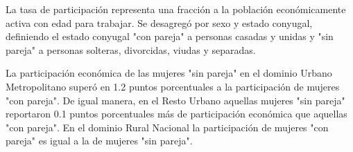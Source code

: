 La tasa de participación representa una fracción a la población económicamente activa con edad para trabajar. Se desagregó por sexo y estado conyugal, definiendo el estado conyugal "con pareja" a personas casadas y unidas y "sin pareja" a personas solteras, divorcidas, viudas y separadas.  

La participación económica de las mujeres "sin pareja" en el dominio Urbano Metropolitano superó en 1.2 puntos porcentuales a la participación de mujeres "con pareja". De igual manera, en el Resto Urbano aquellas mujeres "sin pareja" reportaron 0.1 puntos porcentuales más de participación económica que aquellas "con pareja". En el dominio Rural Nacional la participación de mujeres "con pareja" es igual a la de mujeres "sin pareja". 